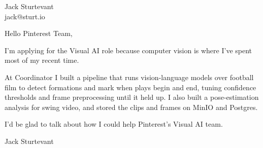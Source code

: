 \documentclass[11pt]{article}
\begin{document}
\raggedright

{\namefont\fontsize{20pt}{24pt}\selectfont Jack Sturtevant}\\[-0.3em]
jack@sturt.io

\vspace{1.2em}

Hello Pinterest Team,

I'm applying for the Visual AI role because computer vision is where I've spent most of my recent time.

At Coordinator I built a pipeline that runs vision-language models over football film to detect formations and mark when plays begin and end, tuning confidence thresholds and frame preprocessing until it held up. I also built a pose-estimation analysis for swing video, and stored the clips and frames on MinIO and Postgres.

I'd be glad to talk about how I could help Pinterest's Visual AI team.

\vspace{0.6em}
Jack Sturtevant
\end{document}
